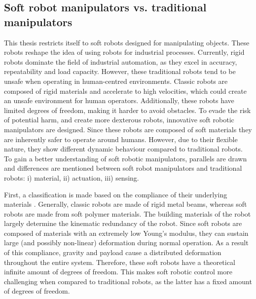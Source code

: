 \subsection*{Soft robot manipulators vs. traditional manipulators }

This thesis restricts itself to soft robots designed for manipulating objects. These robots reshape the idea of using robots for industrial processes. Currently, rigid robots dominate the field of industrial automation, as they excel in accuracy, repeatability and load capacity. However, these traditional robots tend to be unsafe when operating in human-centred environments. Classic robots are composed of rigid materials and accelerate to high velocities, which could create an unsafe environment for human operators. Additionally, these robots have limited degrees of freedom, making it harder to avoid obstacles. To evade the risk of potential harm, and create more dexterous robots, innovative soft robotic manipulators are designed. Since these robots are composed of soft materials they are inherently safer to operate around humans. However, due to their flexible nature, they show different dynamic behaviour compared to traditional robots. To gain a better understanding of soft robotic manipulators, parallels are drawn and differences are mentioned between soft robot manipulators and traditional robots: i) material, ii) actuation, iii) sensing.


First, a classification is made based on the compliance of their underlying materials \cite{Bionics2008}. Generally, classic robots are made of rigid metal beams, whereas soft robots are made from soft polymer materials. The building materials of the robot largely determine the kinematic redundancy of the robot. Since soft robots are composed of materials with an extremely low Young's modulus, they can sustain large (and possibly non-linear) deformation during normal operation. As a result of this compliance, gravity and payload cause a distributed deformation throughout the entire system. Therefore, these soft robots have a theoretical infinite amount of degrees of freedom. This makes soft robotic control more challenging when compared to traditional robots, as the latter has a fixed amount of degrees of freedom.


